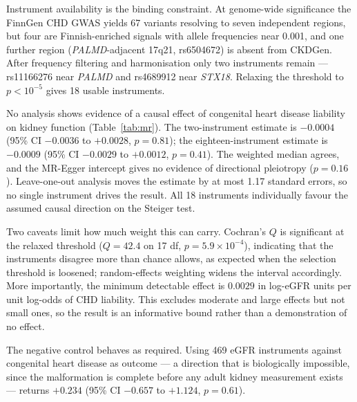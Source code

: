 \documentclass[11pt,a4paper]{article}
\newcommand{\gene}[1]{\textit{#1}}
\begin{document}
Instrument availability is the binding constraint. At genome-wide significance the FinnGen
CHD GWAS yields 67 variants resolving to seven independent regions, but four are
Finnish-enriched signals with allele frequencies near 0.001, and one further region
(\gene{PALMD}-adjacent 17q21, rs6504672) is absent from CKDGen. After frequency filtering and
harmonisation only two instruments remain --- rs11166276 near \gene{PALMD} and rs4689912 near
\gene{STX18}. Relaxing the threshold to $p < 10^{-5}$ gives 18 usable instruments.

No analysis shows evidence of a causal effect of congenital heart disease liability on kidney
function (Table~\ref{tab:mr}). The two-instrument estimate is $-0.0004$ (95\% CI $-0.0036$ to
$+0.0028$, $p = 0.81$); the eighteen-instrument estimate is $-0.0009$ (95\% CI $-0.0029$ to
$+0.0012$, $p = 0.41$). The weighted median agrees, and the MR-Egger intercept gives no
evidence of directional pleiotropy ($p = 0.16$). Leave-one-out analysis moves the estimate by
at most 1.17 standard errors, so no single instrument drives the result. All 18 instruments
individually favour the assumed causal direction on the Steiger test.

Two caveats limit how much weight this can carry. Cochran's $Q$ is significant at the relaxed
threshold ($Q = 42.4$ on 17 df, $p = 5.9 \times 10^{-4}$), indicating that the instruments
disagree more than chance allows, as expected when the selection threshold is loosened;
random-effects weighting widens the interval accordingly. More importantly, the minimum
detectable effect is $0.0029$ in log-eGFR units per unit log-odds of CHD liability. This
excludes moderate and large effects but not small ones, so the result is an informative bound
rather than a demonstration of no effect.

The negative control behaves as required. Using 469 eGFR instruments against congenital heart
disease as outcome --- a direction that is biologically impossible, since the malformation is
complete before any adult kidney measurement exists --- returns $+0.234$ (95\% CI $-0.657$ to
$+1.124$, $p = 0.61$).
\end{document}
